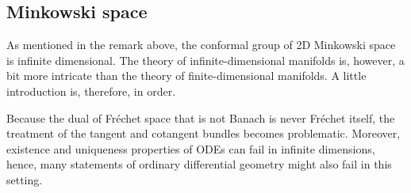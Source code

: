 
\subsection{Minkowski space}

    As mentioned in the remark above, the conformal group of 2D Minkowski space is infinite dimensional. The theory of infinite-dimensional manifolds is, however, a bit more intricate than the theory of finite-dimensional manifolds. A little introduction is, therefore, in order.

    \begin{remark}
        Because the dual of Fr\'echet space that is not Banach is never Fr\'echet itself, the treatment of the tangent and cotangent bundles becomes problematic. Moreover, existence and uniqueness properties of ODEs can fail in infinite dimensions, hence, many statements of ordinary differential geometry might also fail in this setting.
    \end{remark}

